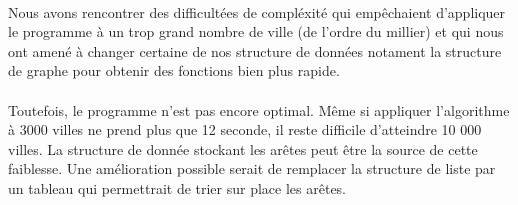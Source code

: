 \documentclass[a4paper]{article}
\begin{document}
\paragraph*{}
Nous avons rencontrer des difficultées de compléxité qui empêchaient d'appliquer le programme à un trop grand nombre de ville (de l'ordre du millier) et qui nous ont amené à changer certaine de nos structure de données notament la structure de graphe pour obtenir des fonctions bien plus rapide.
\paragraph*{}
Toutefois, le programme n'est pas encore optimal. Même si appliquer l'algorithme à 3000 villes ne prend plus que 12 seconde, il reste difficile d'atteindre 10 000 villes. La structure de donnée stockant les arêtes peut être la source de cette faiblesse. Une amélioration possible serait de remplacer la structure de liste par un tableau qui permettrait de trier sur place les arêtes.
\end{document}
